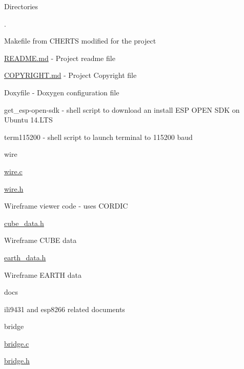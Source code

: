 \begin{DoxyParagraph}{Directories}

\begin{DoxyItemize}
\item .
\begin{DoxyItemize}
\item Makefile from C\-H\-E\-R\-T\-S modified for the project
\item \hyperlink{README_8md}{R\-E\-A\-D\-M\-E.\-md} -\/ Project readme file
\item \hyperlink{COPYRIGHT_8md}{C\-O\-P\-Y\-R\-I\-G\-H\-T.\-md} -\/ Project Copyright file
\item Doxyfile -\/ Doxygen configuration file
\item get\-\_\-esp-\/open-\/sdk -\/ shell script to download an install E\-S\-P O\-P\-E\-N S\-D\-K on Ubuntu 14.\-L\-T\-S
\item term115200 -\/ shell script to launch terminal to 115200 baud
\end{DoxyItemize}
\item wire
\begin{DoxyItemize}
\item \hyperlink{wire_8c}{wire.\-c}
\item \hyperlink{wire_8h}{wire.\-h}
\begin{DoxyItemize}
\item Wireframe viewer code -\/ uses C\-O\-R\-D\-I\-C
\end{DoxyItemize}
\item \hyperlink{cube__data_8h}{cube\-\_\-data.\-h}
\begin{DoxyItemize}
\item Wireframe C\-U\-B\-E data
\end{DoxyItemize}
\item \hyperlink{earth__data_8h}{earth\-\_\-data.\-h}
\begin{DoxyItemize}
\item Wireframe E\-A\-R\-T\-H data
\end{DoxyItemize}
\end{DoxyItemize}
\item docs
\begin{DoxyItemize}
\item ili9431 and esp8266 related documents
\end{DoxyItemize}
\item bridge
\begin{DoxyItemize}
\item \hyperlink{bridge_8c}{bridge.\-c}
\item \hyperlink{bridge_8h}{bridge.\-h}

\end{DoxyItemize}
\end{DoxyItemize}
\end{DoxyParagraph}
